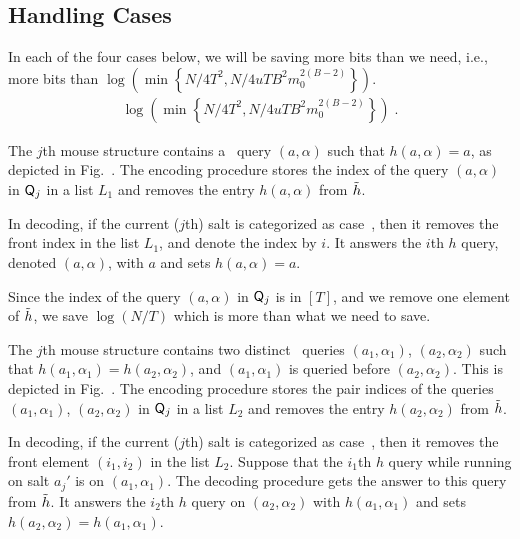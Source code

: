 \subsection{Handling Cases }
In each of the four cases below, we will be saving more bits than we need, i.e., more bits than 
\ifnum{}
$\log\left(\min\left\{{N}/{4T^2},{N}/{4uTB^2m_0^{2(B-2)}}\right\}\right)$.
\else
\begin{align*}
  \log\left(\min\left\{{N}/{4T^2},{N}/{4uTB^2m_0^{2(B-2)}}\right\}\right)\;.
\end{align*}
\fi

\label{sec:easy_cases}
\easymousefig
{} The $j$th mouse structure contains a \new\ query $(a,\alpha)$ such that $h(a,\alpha)=a$, as depicted in Fig.~. The encoding procedure stores the index of the query $(a,\alpha)$ in $\mathsf{Q}_j$ in a list $L_1$ and removes the entry $h(a,\alpha)$ from $\tilde{h}$.  

In decoding, if the current ($j$th) salt is categorized as case~, then it removes the front index in the list $L_1$, and denote the index by $i$. It answers the $i$th $h$ query, denoted $(a,\alpha)$, with $a$ and sets $h(a,\alpha)=a$. 

Since the index of the query $(a,\alpha)$ in $\mathsf{Q}_j$ is in $[T]$, and we remove one element of $\tilde{h}$, we save $\log (N/T)$ which is more than what we need to save.

 

The $j$th mouse structure contains two distinct \new\ queries $(a_1,\alpha_1)$, $(a_2,\alpha_2)$ such that $h(a_1,\alpha_1)=h(a_2,\alpha_2)$, and $(a_1,\alpha_1)$ is queried before $(a_2,\alpha_2)$. This is depicted in Fig.~. The encoding procedure stores the pair indices of the queries $(a_1,\alpha_1)$, $(a_2,\alpha_2)$ in $\mathsf{Q}_j$ in a list $L_2$ and removes the entry $h(a_2,\alpha_2)$ from $\tilde{h}$. 

In decoding, if the current ($j$th) salt is categorized as case~, then it removes the front element $(i_1,i_2)$ in the list $L_2$. Suppose that the $i_1$th $h$ query while running on salt $a_j'$ is on $(a_1,\alpha_1)$. The decoding procedure gets the answer to this query from $\tilde{h}$. It answers the $i_2$th $h$ query on $(a_2,\alpha_2)$ with $h(a_1,\alpha_1)$ and sets $h(a_2,\alpha_2)=h(a_1,\alpha_1)$. 


